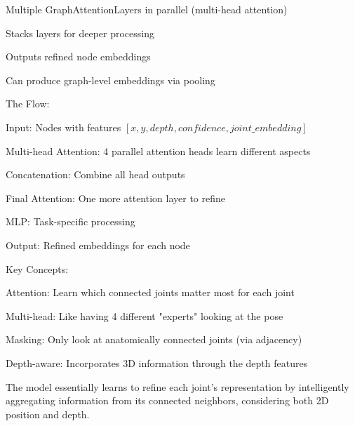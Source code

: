 \begin{compactitem}
   \item Multiple GraphAttentionLayers in parallel (multi-head attention)
   \item Stacks layers for deeper processing
   \item Outputs refined node embeddings 
   \item Can produce graph-level embeddings via pooling
\end{compactitem}

The Flow:

\begin{compactitem}
   \item Input: Nodes with features $[x, y, depth, confidence, joint\_embedding]$
   \item Multi-head Attention: 4 parallel attention heads learn different aspects
   \item Concatenation: Combine all head outputs
   \item Final Attention: One more attention layer to refine
   \item MLP: Task-specific processing
   \item Output: Refined embeddings for each node
\end{compactitem}

Key Concepts:

\begin{compactitem}
   \item Attention: Learn which connected joints matter most for each joint
   \item Multi-head: Like having 4 different "experts" looking at the pose
   \item Masking: Only look at anatomically connected joints (via adjacency)
   \item Depth-aware: Incorporates 3D information through the depth features
\end{compactitem}

The model essentially learns to refine each joint's representation by
intelligently aggregating information from its connected neighbors, considering
both 2D position and depth.

